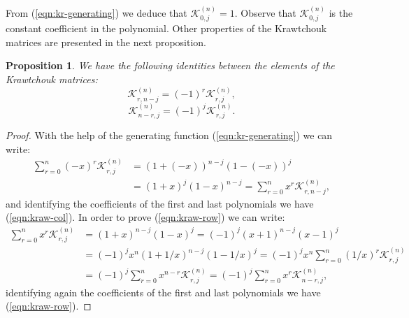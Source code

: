 \documentclass{article}
\newtheorem{proposition}{Proposition}
\newcommand{\krawel}[3]{\mathcal{K}^{#1}_{#2,#3}}
\begin{document}
From (\ref{eqn:kr-generating}) we deduce that $\krawel{(n)}{0}{j} = 1$. Observe that $\krawel{(n)}{0}{j}$ is the constant coefficient in the polynomial. Other properties of the Krawtchouk matrices are presented in the next proposition.
\begin{proposition}
\label{prop:kraw-col}
We have the following identities between the elements of the Krawtchouk matrices:
\begin{equation}
\label{eqn:kraw-col}
\krawel{(n)}{r}{n-j} = (-1)^r  \krawel{(n)}{r}{j} ,
\end{equation}
\begin{equation}
\label{eqn:kraw-row}
\krawel{(n)}{n-r}{j} = (-1)^j  \krawel{(n)}{r}{j} .
\end{equation}

\end{proposition}
\begin{proof}
With the help of the generating function (\ref{eqn:kr-generating}) we can write:
\begin{align}
\sum_{r=0}^n (-x)^r \krawel{(n)}{r}{j} &= (1+(-x))^{n-j}(1-(-x))^{j} \nonumber \\
&= (1+x)^{j}(1-x)^{n-j} = \sum_{r=0}^n x^r \krawel{(n)}{r}{n-j}, \nonumber
\end{align}
and identifying the coefficients of the first and last polynomials we have (\ref{eqn:kraw-col}). In order to prove (\ref{eqn:kraw-row}) we can write:
\begin{align}
\sum_{r=0}^n x^r \krawel{(n)}{r}{j} &= (1+x)^{n-j}(1-x)^{j} = (-1)^j(x+1)^{n-j}(x-1)^{j} \nonumber \\
&= (-1)^j x^n (1+1/x)^{n-j}(1-1/x)^{j} = (-1)^j x^n \sum_{r=0}^n (1/x)^r \krawel{(n)}{r}{j} \nonumber \\
&= (-1)^j \sum_{r=0}^n x^{n-r} \krawel{(n)}{r}{j} = (-1)^j \sum_{r=0}^n x^{r} \krawel{(n)}{n-r}{j}, \nonumber
\end{align}
identifying again the coefficients of the first and last polynomials we have (\ref{eqn:kraw-row}).
\end{proof}
\end{document}
